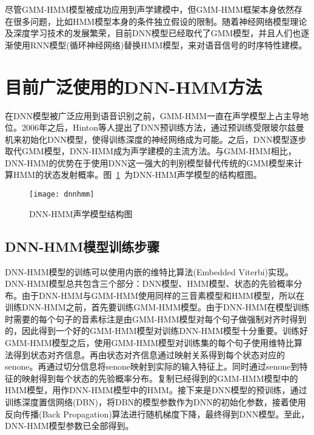尽管GMM-HMM模型被成功应用到声学建模中，但GMM-HMM框架本身依然存在很多问题，比如HMM模型本身的条件独立假设的限制。随着神经网络模型理论及深度学习技术的发展繁荣，目前DNN模型已经取代了GMM模型，并且人们也逐渐使用RNN模型(循环神经网络)替换HMM模型，来对语音信号的时序特性建模。
\section{目前广泛使用的DNN-HMM方法}
在DNN模型被广泛应用到语音识别之前，GMM-HMM一直在声学模型上占主导地位。2006年之后，Hinton等人提出了DNN预训练方法，通过预训练受限玻尔兹曼机来初始化DNN模型，使得训练深度的神经网络成为可能。之后，DNN模型逐步取代GMM模型，DNN-HMM成为声学建模的主流方法。与GMM-HMM相比，DNN-HMM的优势在于使用DNN这一强大的判别模型替代传统的GMM模型来计算HMM的状态发射概率。图~\ref{fig:dnnhmm}~为DNN-HMM声学模型的结构框图。
\begin{figure}[htbp]
\centering
\texttt{[image: dnnhmm]}
\caption{DNN-HMM声学模型结构图\cite{yu2012automatic}}\label{fig:dnnhmm}
\vspace{\baselineskip}
\end{figure}
\subsection{DNN-HMM模型训练步骤}
DNN-HMM模型的训练可以使用内嵌的维特比算法(Embedded Viterbi)实现。DNN-HMM模型总共包含三个部分：DNN模型、HMM模型、状态的先验概率分布。由于DNN-HMM与GMM-HMM使用同样的三音素模型和HMM模型，所以在训练DNN-HMM之前，首先要训练GMM-HMM模型。由于DNN-HMM在模型训练时需要的每个句子的音素标注是由GMM-HMM模型对每个句子做强制对齐时得到的，因此得到一个好的GMM-HMM模型对训练DNN-HMM模型十分重要。训练好GMM-HMM模型之后，使用GMM-HMM模型对训练集的每个句子使用维特比算法得到状态对齐信息。再由状态对齐信息通过映射关系得到每个状态对应的senone。再通过切分信息将senone映射到实际的输入特征上。同时通过senone到特征的映射得到每个状态的先验概率分布。复制已经得到的GMM-HMM模型中的HMM模型，用作DNN-HMM模型中的HMM。接下来是DNN模型的预训练，通过训练深度置信网络(DBN)，将DBN的模型参数作为DNN的初始化参数，接着使用反向传播(Back Propagation)算法进行随机梯度下降，最终得到DNN模型。至此，DNN-HMM模型参数已全部得到。
